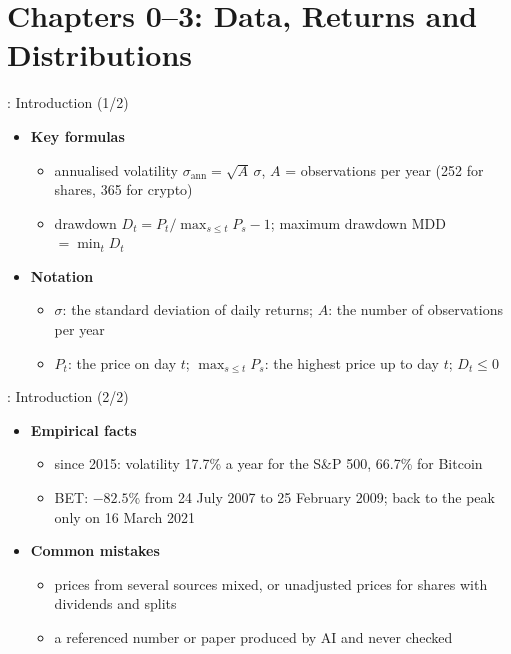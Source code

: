 \section{Chapters 0--3: Data, Returns and Distributions}

\begin{frame}{: Introduction (1/2)}
\itemsize{\small}
\begin{itemize}
    \item \textbf{Key formulas}
    \begin{itemize}
        \item annualised volatility $\sigma_{\text{ann}} = \sqrt{A}\,\sigma$, $A$ = observations per year (252 for shares, 365 for crypto)
        \item drawdown $D_t = P_t/\max_{s \le t}P_s - 1$; maximum drawdown MDD $= \min_t D_t$
    \end{itemize}
    \item \textbf{Notation}
    \begin{itemize}
        \item $\sigma$: the standard deviation of daily returns; $A$: the number of observations per year
        \item $P_t$: the price on day $t$; $\max_{s \le t}P_s$: the highest price up to day $t$; $D_t \le 0$
    \end{itemize}
\end{itemize}
\end{frame}

\begin{frame}{: Introduction (2/2)}
\itemsize{\small}
\begin{itemize}
    \item \textbf{Empirical facts}
    \begin{itemize}
        \item since 2015: volatility 17.7\% a year for the S\&P 500, 66.7\% for Bitcoin
        \item BET: $-82.5\%$ from 24 July 2007 to 25 February 2009; back to the peak only on 16 March 2021
    \end{itemize}
    \item \textbf{Common mistakes}
    \begin{itemize}
        \item prices from several sources mixed, or unadjusted prices for shares with dividends and splits
        \item a referenced number or paper produced by AI and never checked
    \end{itemize}
\end{itemize}
\end{frame}

